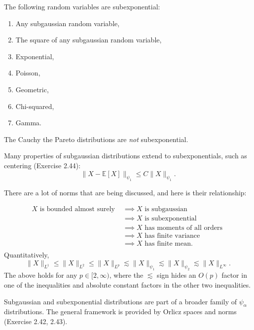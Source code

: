 \begin{example}[]
\label{ex:2.8.7}
The following random variables are subexponential:
\begin{enumerate}
	\item Any subgaussian random variable,
	\item The square of any subgaussian random variable, 
	\item Exponential,
	\item Poisson,
	\item Geometric,
	\item Chi-squared,
	\item Gamma.
\end{enumerate}
The Cauchy the Pareto distributions are \textit{not} subexponential.
\end{example}

Many properties of subgaussian distributions extend to subexponentials, such as centering (Exercise 2.44):
\[ \lVert X - \mathbb{E}[X] \rVert_{\psi_1} \leq C \lVert X \rVert_{\psi_1}. \]

There are a lot of norms that are being discussed, and here is their relationship: 
\begin{remark}
\label{rmk:2.8.8}
\begin{align*}
	X \text{ is bounded almost surely } 
	&\implies X \text{ is subgaussian } \\
	&\implies X \text{ is subexponential } \\
	&\implies X \text{ has moments of all orders } \\
	&\implies X \text{ has finite variance } \\
	&\implies X \text{ has finite mean}. \\
\end{align*}
Quantitatively, 
\[ \lVert X \rVert_{L^1} \leq \lVert X \rVert_{L^2} \leq \lVert X \rVert_{L^p} 
\lesssim \lVert X \rVert_{\psi_1} \lesssim \lVert X \rVert_{\psi_2} \lesssim \lVert X \rVert_{L^\infty}. \]
The above holds for any $p \in [2, \infty)$, where the $\lesssim$ sign hides an $O(p)$ factor in one of the 
inequalities and absolute constant factors in the other two inequalities.
\end{remark}

\begin{remark}
\label{rmk:2.8.9}
Subgaussian and subexponential distributions are part of a broader family of $\psi_{\alpha}$ distributions. 
The general framework is provided by Orlicz spaces and norms (Exercise 2.42, 2.43).
\end{remark}


